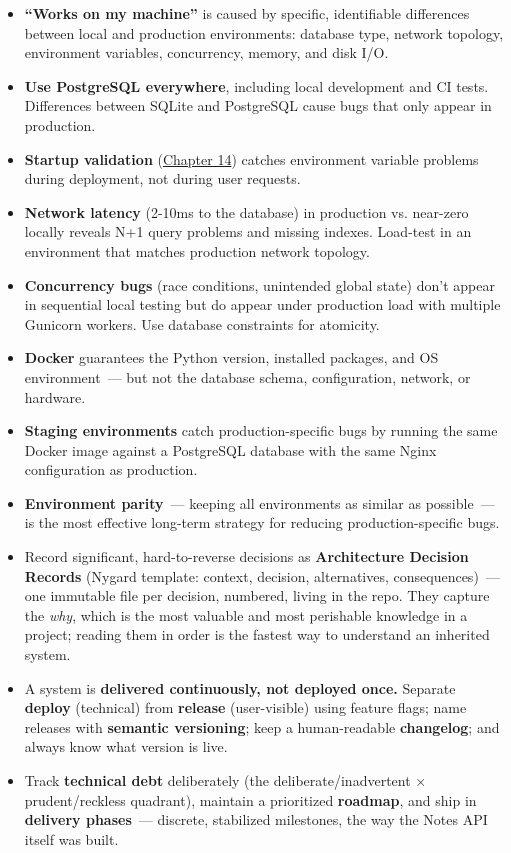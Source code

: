 \label{39-local-vs-production:key-takeaways}
\begin{takeaways}

\begin{itemize}
\tightlist
\item
  \textbf{``Works on my machine''} is caused by specific, identifiable differences between local and production environments: database type, network topology, environment variables, concurrency, memory, and disk I/O.
\item
  \textbf{Use PostgreSQL everywhere}, including local development and CI tests. Differences between SQLite and PostgreSQL cause bugs that only appear in production.
\item
  \textbf{Startup validation} (\hyperref[ch:14-runtime-contract]{Chapter 14}) catches environment variable problems during deployment, not during user requests.
\item
  \textbf{Network latency} (2-10ms to the database) in production vs. near-zero locally reveals N+1 query problems and missing indexes. Load-test in an environment that matches production network topology.
\item
  \textbf{Concurrency bugs} (race conditions, unintended global state) don't appear in sequential local testing but do appear under production load with multiple Gunicorn workers. Use database constraints for atomicity.
\item
  \textbf{Docker} guarantees the Python version, installed packages, and OS environment~--- but not the database schema, configuration, network, or hardware.
\item
  \textbf{Staging environments} catch production-specific bugs by running the same Docker image against a PostgreSQL database with the same Nginx configuration as production.
\item
  \textbf{Environment parity}~--- keeping all environments as similar as possible~--- is the most effective long-term strategy for reducing production-specific bugs.
\item
  Record significant, hard-to-reverse decisions as \textbf{Architecture Decision Records} (Nygard template: context, decision, alternatives, consequences)~--- one immutable file per decision, numbered, living in the repo. They capture the \emph{why}, which is the most valuable and most perishable knowledge in a project; reading them in order is the fastest way to understand an inherited system.
\item
  A system is \textbf{delivered continuously, not deployed once.} Separate \textbf{deploy} (technical) from \textbf{release} (user-visible) using feature flags; name releases with \textbf{semantic versioning}; keep a human-readable \textbf{changelog}; and always know what version is live.
\item
  Track \textbf{technical debt} deliberately (the deliberate/inadvertent × prudent/reckless quadrant), maintain a prioritized \textbf{roadmap}, and ship in \textbf{delivery phases}~--- discrete, stabilized milestones, the way the Notes API itself was built.
\end{itemize}

\end{takeaways}

